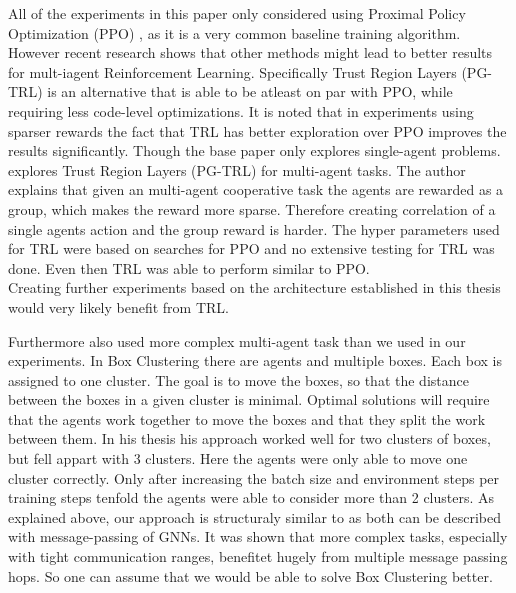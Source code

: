 All of the experiments in this paper only considered using Proximal Policy Optimization (PPO) \citet{SchulmanWDRK17}, as it is a very common baseline training algorithm.
However recent research shows that other methods might lead to better results for mult-iagent Reinforcement Learning.
Specifically Trust Region Layers (PG-TRL) \citet{otto2021differentiable} is an alternative that is able to be atleast on par with PPO, while requiring less code-level optimizations. It is noted that in experiments using sparser rewards the fact that TRL has better exploration over PPO improves the results significantly. Though the base paper only explores single-agent problems.\\
\citet{RobinRuede2021} explores Trust Region Layers (PG-TRL) \citet{otto2021differentiable} for multi-agent tasks. The author explains that given an multi-agent cooperative task the agents are rewarded as a group, which makes the reward more sparse. Therefore creating correlation of a single agents action and the group reward is harder. The hyper parameters used for TRL were based on searches for PPO and no extensive testing for TRL was done. Even then TRL was able to perform similar to PPO.\\
Creating further experiments based on the architecture established in this thesis would very likely benefit from TRL. \par

Furthermore \citet{RobinRuede2021} also used more complex multi-agent task than we used in our experiments. In Box Clustering there are agents and multiple boxes. Each box is assigned to one cluster. The goal is to move the boxes, so that the distance between the boxes in a given cluster is minimal. Optimal solutions will require that the agents work together to move the boxes and that they split the work between them. In his thesis his approach worked well for two clusters of boxes, but fell appart with 3 clusters. Here the agents were only able to move one cluster correctly. Only after increasing the batch size and environment steps per training steps tenfold the agents were able to consider more than 2 clusters. As explained above, our approach is structuraly similar to \citet{RobinRuede2021} as both can be described with message-passing of GNNs. It was shown that more complex tasks, especially with tight communication ranges, benefitet hugely from multiple message passing hops. So one can assume that we would be able to solve Box Clustering better.\par

